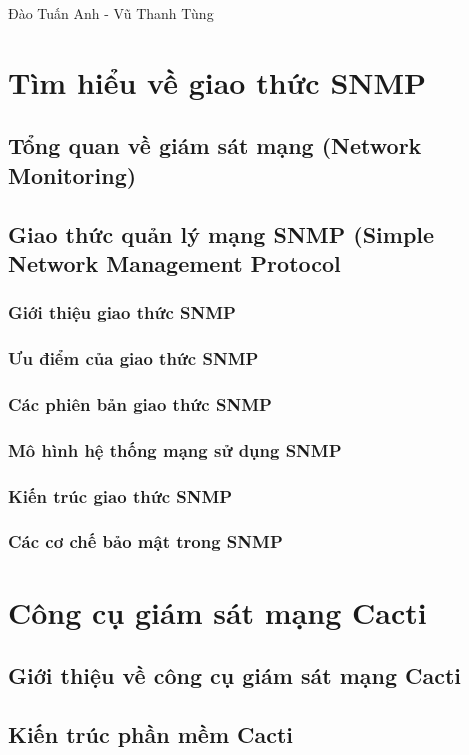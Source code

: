 \documentclass[12pt,oneside,a4paper]{article}
\begin{document}
Đào Tuấn Anh - Vũ Thanh Tùng
\newpage

\section{Tìm hiểu về giao thức SNMP}
\subsection{Tổng quan về giám sát mạng (Network Monitoring)}
\subsection{Giao thức quản lý mạng SNMP (Simple Network Management Protocol}
\subsubsection{Giới thiệu giao thức SNMP}
\subsubsection{Ưu điểm của giao thức SNMP}
\subsubsection{Các phiên bản giao thức SNMP}
\subsubsection{Mô hình hệ thống mạng sử dụng SNMP}
\subsubsection{Kiến trúc giao thức SNMP}
\subsubsection{Các cơ chế bảo mật trong SNMP}

\section{Công cụ giám sát mạng Cacti}
\subsection{Giới thiệu về công cụ giám sát mạng Cacti}
\subsection{Kiến trúc phần mềm Cacti}
\end{document}
